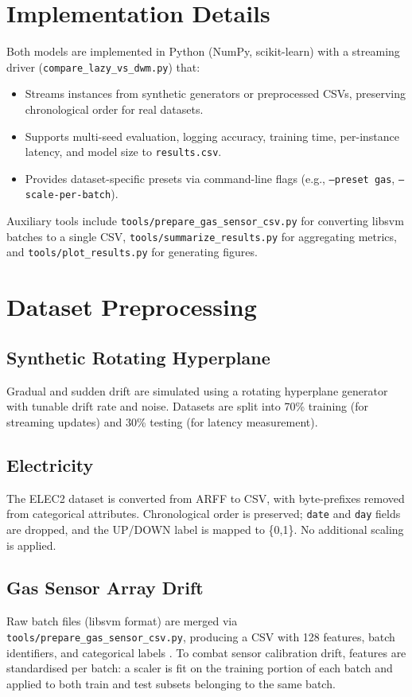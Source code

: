 \section{Implementation Details}
Both models are implemented in Python (NumPy, scikit-learn) with a streaming driver (\texttt{compare\_lazy\_vs\_dwm.py}) that:
\begin{itemize}
    \item Streams instances from synthetic generators or preprocessed CSVs, preserving chronological order for real datasets.
    \item Supports multi-seed evaluation, logging accuracy, training time, per-instance latency, and model size to \texttt{results.csv}.
    \item Provides dataset-specific presets via command-line flags (e.g., \texttt{--preset gas}, \texttt{--scale-per-batch}).
\end{itemize}
Auxiliary tools include \texttt{tools/prepare\_gas\_sensor\_csv.py} for converting libsvm batches to a single CSV, \texttt{tools/summarize\_results.py} for aggregating metrics, and \texttt{tools/plot\_results.py} for generating figures.

\section{Dataset Preprocessing}
\subsection{Synthetic Rotating Hyperplane}
Gradual and sudden drift are simulated using a rotating hyperplane generator with tunable drift rate and noise.  Datasets are split into 70\% training (for streaming updates) and 30\% testing (for latency measurement).

\subsection{Electricity}
The ELEC2 dataset is converted from ARFF to CSV, with byte-prefixes removed from categorical attributes.  Chronological order is preserved; \texttt{date} and \texttt{day} fields are dropped, and the UP/DOWN label is mapped to \{0,1\}.  No additional scaling is applied.

\subsection{Gas Sensor Array Drift}
Raw batch files (libsvm format) are merged via \texttt{tools/prepare\_gas\_sensor\_csv.py}, producing a CSV with 128 features, batch identifiers, and categorical labels \cite{vergara2012gas}.  To combat sensor calibration drift, features are standardised per batch: a scaler is fit on the training portion of each batch and applied to both train and test subsets belonging to the same batch.

